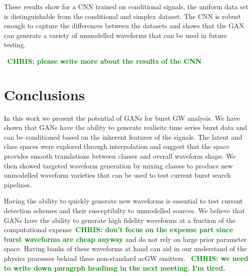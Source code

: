 \documentclass[12pt]{iopart}
\newcommand{\chris}[1]{\textbf{\textcolor{green}{CHRIS: #1}}}
\begin{document}
These results show for a \ac{CNN} trained on conditional signals, the uniform data
set is distinguishable from the conditional and simplex dataset. The \ac{CNN} is
robust enough to capture the differences between the datasets and shows that
the GAN can generate a variety of unmodelled waveforms that can be used in
future testing. 

~\chris{please write more about the results of the CNN}


\section{Conclusions}

%
In this work we present the potential of \acp{GAN} for
burst \ac{GW} analysis. We have shown that \acp{GAN} have the ability to generate realisitc time series burst data and can be conditioned based on the inherent features of the signals. The latent and class spaces were explored through interpolation and
suggest that the space provides smooth translations between classes and overall
waveform shape. We then showed targeted waveform generation by mixing classes
to produce new unmodelled waveform varieties that can be used to test current
burst search pipelines.

%

Having the ability to quickly
generate new waveforms is essential to test current detection schemes and their
susceptibilty to unmodelled sources. We believe that \acp{GAN} have the ability
to generate high fidelity waveforms at a fraction of the computational
expense~\chris{don't focus on the expense part since burst waveforms are cheap
anyway} and do not rely on large prior parameter space. Having banks of these
waveforms at hand can aid in our understand of the physics processes behind
these non-standard ac{GW} emitters.  
~\chris{we need to write down paragrph headinsg in the next meeting. I'm tired.}

\end{document}
